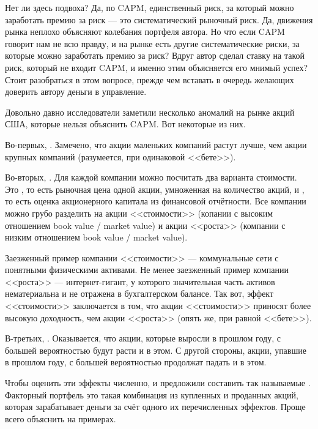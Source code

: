 Нет ли здесь подвоха? Да, по CAPM, единственный риск, за который можно заработать премию за риск --- это систематический рыночный риск. Да, движения рынка неплохо объясняют колебания портфеля автора. Но что если CAPM говорит нам не всю правду, и на рынке есть другие систематические риски, за которые можно заработать премию за риск? Вдруг автор сделал ставку на такой риск, который не входит CAPM, и именно этим объясняется его мнимый успех? Стоит разобраться в этом вопросе, прежде чем вставать в очередь желающих доверить автору деньги в управление.

Довольно давно исследователи заметили несколько аномалий на рынке акций США, которые нельзя объяснить CAPM. Вот некоторые из них.

Во-первых, . Замечено, что акции маленьких компаний растут лучше, чем акции крупных компаний (разумеется, при одинаковой <<бете>>).

Во-вторых, . Для каждой компании можно посчитать два варианта стоимости. Это , то есть рыночная цена одной акции, умноженная на количество акций, и , то есть оценка акционерного капитала из финансовой отчётности. Все компании можно грубо разделить на акции <<стоимости>> (копании с высоким отношением book value / market value) и акции <<роста>> (компании с низким отношением book value / market value).

Заезженный пример компании <<стоимости>> --- коммунальные сети с понятными физическими активами. Не менее заезженный пример компании <<роста>> --- интернет-гигант, у которого значительная часть активов нематериальна и не отражена в бухгалтерском балансе. Так вот, эффект <<стоимости>> заключается в том, что акции <<стоимости>> приносят более высокую доходность, чем акции <<роста>> (опять же, при равной <<бете>>).

В-третьих, . Оказывается, что акции, которые выросли в прошлом году, с большей вероятностью будут расти и в этом. С другой стороны, акции, упавшие в прошлом году, с большей вероятностью продолжат падать и в этом.

Чтобы оценить эти эффекты численно,  и  предложили составить так называемые . Факторный портфель это такая комбинация из купленных и проданных акций, которая зарабатывает деньги за счёт одного их перечисленных эффектов. Проще всего объяснить на примерах.


